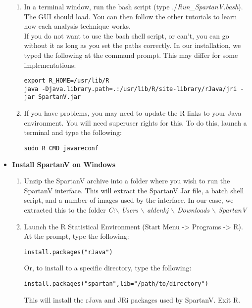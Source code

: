 \documentclass[a4paper,11pt]{article}
\begin{document}
\begin{itemize}
\begin{enumerate}
\item In a terminal window, run the bash script (type ./\textit{Run\_SpartanV.bash}). The GUI should load. You can then follow the other tutorials to learn how each analysis technique works.
\\
If you do not want to use the bash shell script, or can't, you can go without it as long as you set the paths correctly. In our installation, we typed the following at the command prompt. This may differ for some implementations:
\begin{verbatim}
export R_HOME=/usr/lib/R
java -Djava.library.path=.:/usr/lib/R/site-library/rJava/jri -jar SpartanV.jar
\end{verbatim}

\item If you have problems, you may need to update the R links to your Java environment. You will need superuser rights for this. To do this, launch a terminal and type the following:
\begin{verbatim}
sudo R CMD javareconf
\end{verbatim}

\end{enumerate}

\item \textbf{Install SpartanV on Windows}\\

\begin{enumerate}

\item Unzip the SpartanV archive into a folder where you wish to run the SpartanV interface. This will extract the SpartanV Jar file, a batch shell script, and a number of images used by the interface. In our case, we extracted this to the folder \textit{C:$\backslash$ Users $\backslash$ aldenkj $\backslash$ Downloads $\backslash$ SpartanV }
\\

\item Launch the R Statistical Environment (Start Menu -> Programs -> R). At the prompt, type the following:
\begin{verbatim}
install.packages("rJava")
\end{verbatim}
Or, to install to a specific directory, type the following:
\begin{verbatim}
install.packages("spartan",lib="/path/to/directory")
\end{verbatim}
This will install the rJava and JRi packages used by SpartanV. Exit R.
\\


\end{enumerate}
\end{itemize}
\end{document}
